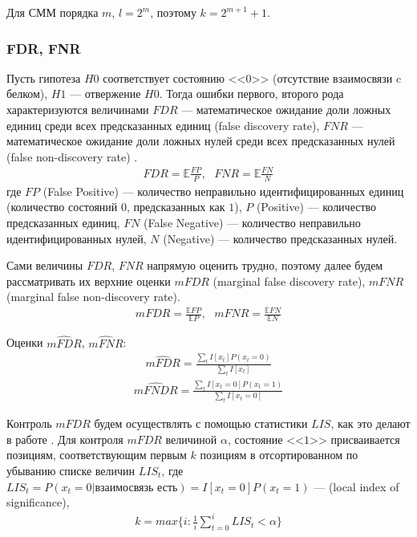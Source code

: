 \documentclass{matmex-diploma-custom}
\begin{document}
Для СММ порядка $m$, $l=2^m$, поэтому $k = 2^{m+1}+1$.

\subsubsection*{FDR, FNR} 
Пусть гипотеза $\textit{H0}$ соответствует состоянию <<$0$>> (отсутствие взаимосвязи c белком), $\textit{H1}$ --- отвержение $\textit{H0}$.
Тогда ошибки первого, второго рода характеризуются величинами $\textit{FDR}$ --- математическое ожидание доли ложных единиц среди всех предсказанных единиц (false discovery rate),
$\textit{FNR}$ --- математическое ожидание доли ложных нулей среди всех предсказанных нулей  (false non-discovery rate) \cite{Sun2009}.
\begin{align}
\textit{FDR} = \mathbb{E}\frac{\textit{FP}}{\textit{P}}, 
~~~\textit{FNR} = \mathbb{E}\frac{\textit{FN}}{\textit{N}}
\end{align}
где $\textit{FP}$ (False Positive) --- количество неправильно идентифицированных единиц (количество состояний $0$, предсказанных как $1$), $\textit{P}$ (Positive) --- количество предсказанных единиц, $\textit{FN}$ (False Negative) --- количество неправильно идентифицированных нулей, $\textit{N}$ (Negative) --- количество предсказанных нулей. 

Сами величины $\textit{FDR}$, $\textit{FNR}$ напрямую оценить трудно, поэтому далее будем рассматривать их верхние оценки $\textit{mFDR}$ (marginal false discovery rate), $\textit{mFNR}$ (marginal false non-discovery rate).
\begin{align}
\textit{mFDR} = \frac{\mathbb{E}\textit{FP}}{\mathbb{E} \textit{P}}, 
~~~\textit{mFNR} = \frac{\mathbb{E}\textit{FN}}{\mathbb{E} \textit{N}}
\end{align}

Оценки $\hat{\textit{mFDR}}$, $\hat{\textit{mFNR}}$:
\begin{align}
\hat{\textit{mFDR}} = \frac{\sum_{t}{I[x_t]P(x_t=0)}}{\sum_{t}{I[x_t]}}
\label{formula:est_mFDR}
\end{align}
\begin{align}
\hat{\textit{mFNDR}} = \frac{\sum_{t}{I[x_t=0]P(x_t=1)}}{\sum_{t}{I[x_t=0]}}
\label{formula:est_mFNR}
\end{align}

Контроль $\textit{mFDR}$ будем осуществлять с помощью статистики $\textit{LIS}$, как это делают в работе \cite{Sun2009}. 
Для контроля $\textit{mFDR}$ величиной $\alpha$, состояние <<$1$>> присваивается позициям, соответствующим первым $ k $ позициям в отсортированном по убыванию списке величин $\textit{LIS}_{t}$, где
$\textit{LIS}_{t} = P(x_t=0| \text{взаимосвязь есть}) = I[x_t=0]P(x_t=1)$ --- (local index of significance),
\begin{align}
k = max\{i: \frac{1}{i}\sum_{t=0}^{i}{\textit{LIS}_{t}} < \alpha\}
\end{align}
\end{document}
